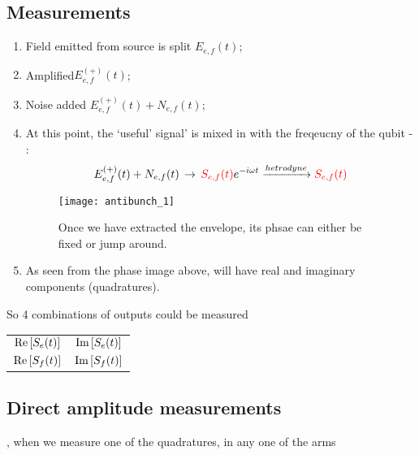       \subsection{Measurements}
      \begin{enumerate}
      \item Field emitted from source is split \hfill $ E_{e,f}(t) $;
      \item Amplified\hfill $ E_{e,f}^{(+)}(t) $;
      \item Noise added \hfill $ E_{e,f}^{(+)}(t) + N_{e,f}(t) $;
      \item At this point, the `useful' signal' is  mixed in with the freqeucny of the qubit -
        :
 	\begin{equation}\label{key}
          E_{e,f}^{(+)}(t) + N_{e,f}(t) \,\rightarrow\, {\color{red}{S_{e,f}(t)}}e^{-i\omega t} \xrightarrow{hetrodyne} {\color{red}{S_{e,f}(t)}}
 	\end{equation}
 	\begin{figure}[h]
          \begin{center}
            \texttt{[image: antibunch\_1]}
          \end{center}
          \caption{Once we have extracted the envelope, its  phsae can either be fixed or jump
            around. \label{fig:bunching_1}}
 	\end{figure}
      \item As seen from the phase image above,  will
        have real and imaginary components (quadratures).
      \end{enumerate}
      So 4 combinations of outputs could be measured
      \begin{table}[h]
        \centering
        \begin{tabular}{|c|c|}
          \hline $ \text{Re}\left[S_e(t)\right] $ & $ \text{Im}\left[S_e(t)\right] $\\
          $ \text{Re}\left[S_f(t)\right] $ & $ \text{Im}\left[S_f(t)\right] $\\\hline
        \end{tabular}
      \end{table}
  
  
 \subsection{Direct amplitude measurements}
 , when we measure one of  the quadratures, in any one
 of the arms
  

